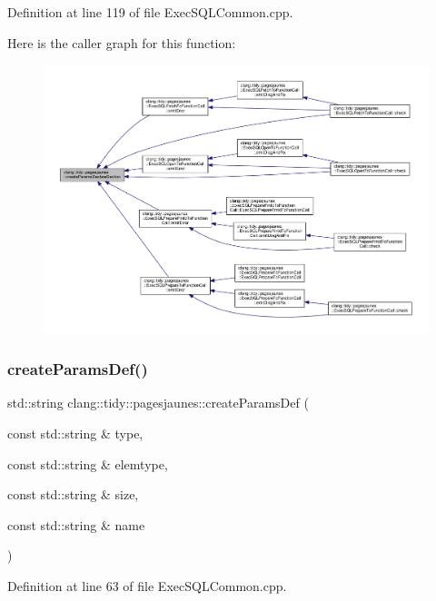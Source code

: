 Definition at line 119 of file Exec\+S\+Q\+L\+Common.\+cpp.

Here is the caller graph for this function\+:
\nopagebreak
\begin{figure}[H]
\begin{center}
\leavevmode
\includegraphics[width=350pt]{namespaceclang_1_1tidy_1_1pagesjaunes_a99da61353138ae9d98e57b2c77bf025c_icgraph}
\end{center}
\end{figure}
\mbox{\label{namespaceclang_1_1tidy_1_1pagesjaunes_a1701f2f2432329ae3bb191dec9a9fa25}} 
\subsubsection{\texorpdfstring{create\+Params\+Def()}{createParamsDef()}}
{\footnotesize\ttfamily std\+::string clang\+::tidy\+::pagesjaunes\+::create\+Params\+Def (\begin{DoxyParamCaption}\item[{const std\+::string \&}]{type,  }\item[{const std\+::string \&}]{elemtype,  }\item[{const std\+::string \&}]{size,  }\item[{const std\+::string \&}]{name }\end{DoxyParamCaption})}



Definition at line 63 of file Exec\+S\+Q\+L\+Common.\+cpp.


